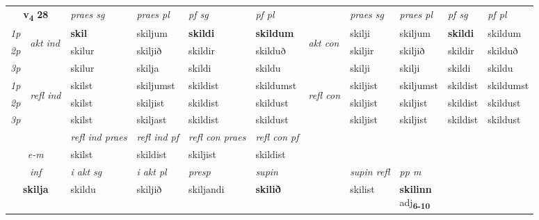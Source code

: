 \noindent
\begin{tabular}{lllllllllll} \toprule
\multicolumn{2}{c}{\textbf{v{\textsubscript{4}}} \Large{\textbf{28}}}  &  \textit{praes sg}  & \textit{praes pl}  &\textit{ pf sg} & \textit{pf pl} &  &  \textit{praes sg}  & \textit{praes pl}  & \textit{pf sg} & \textit{pf pl } \\*
	\cmidrule{3-6} \cmidrule{8-11}
 {\textit{1p}} & \multirow{3}{*}{\begin{turn}{90}\textit{akt ind}\end{turn}} & \textbf{skil} & skiljum & \textbf{skildi} & \textbf{skildum} & \multirow{3}{*}{\begin{turn}{90}\textit{akt con}\end{turn}} &skilji & skiljum & \textbf{skildi} & skildum\\*
 {\textit{2p}} &  &  skilur  & skiljið & skildir & skilduð & & skiljir & skiljið & skildir & skilduð \\*
{\textit{3p}} &  & skilur & skilja & skildi & skildu & & skilji & skilji& skildi & skildu \\*
\cmidrule{3-6} \cmidrule{8-11}
 {\textit{1p}} & \multirow{3}{*}{\begin{turn}{90}\textit{refl ind}\end{turn}}  & skilst & skiljumst & skildist & skildumst & \multirow{3}{*}{\begin{turn}{90}\textit{refl con}\end{turn}}  &skiljist & skiljumst & skildist & skildumst \\*
 {\textit{2p}} &  & skilst & skiljist & skildist & skildust & &skiljist & skiljist & skildist & skildust \\*
 {\textit{3p}}  & & skilst & skiljast & skildist & skildust & & skiljist & skiljist& skildist & skildust \\*
\cmidrule{3-6} \cmidrule{8-11}

 & & \textit{refl ind praes} & \textit{refl ind pf} & \textit{refl con praes} & \textit{refl con pf} \\*
 \multicolumn{2}{c}{ \textit{e-m} }& skilst & skildist & skiljist & skildist \\*

\cmidrule{3-9}
   \multicolumn{2}{c}{\textit{inf}}  & \textit{i akt sg} & \textit{i akt pl}   & \textit{presp} & \textit{supin} && \textit{supin refl} & \textit{pp m} \\*
  \multicolumn{2}{c}{\textbf{skilja}} & skildu  & skiljið   & skiljandi &  \textbf{skilið} && skilist & \specialcell{\textbf{skilinn} \\ adj\textbf{\textsubscript{6-10}}} \\*
\end{tabular}

